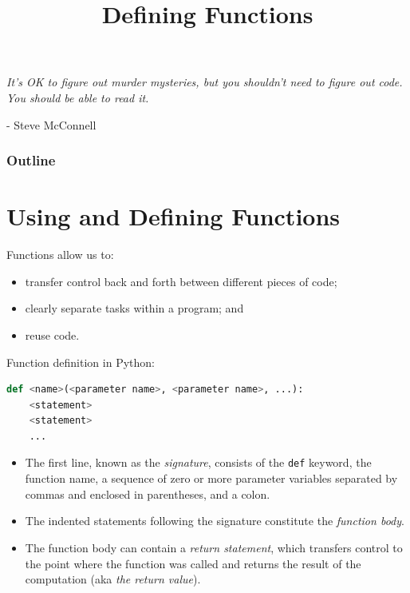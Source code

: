 \documentclass[8pt,a4paper,compress,handout]{beamer}
\title{Defining Functions}
\date{}
\begin{document}
\begin{frame}
\hfill
\begin{minipage}{150pt}
\begin{flushright}
\tiny \emph{It's OK to figure out murder mysteries, but you shouldn't need to figure out code. You should be able to read it.}

\smallskip

- Steve McConnell
\end{flushright}
\end{minipage}
\titlepage
\end{frame}

\begin{frame}
\frametitle{Outline}
\tableofcontents
\end{frame}

\section{Using and Defining Functions}
\begin{frame}[fragile]
Functions allow us to:
\begin{itemize}
\item transfer control back and forth between different pieces of code; 
\item clearly separate tasks within a program; and
\item reuse code.
\end{itemize}

\bigskip

Function definition in Python:
\begin{lstlisting}[language=Python]
def <name>(<parameter name>, <parameter name>, ...):
    <statement>
    <statement>
    ...
\end{lstlisting}

\begin{itemize}
\item The first line, known as the \emph{signature}, consists of the \lstinline{def} keyword, the function name, a sequence of zero or more parameter variables separated by commas and enclosed in parentheses, and a colon.

\item The indented statements following the signature constitute the \emph{function body}.

\item The function body can contain a \emph{return statement}, which transfers control to the point where the function was called and returns the result of the computation (aka \emph{the return value}).
\end{itemize}
\end{frame}
\end{document}
